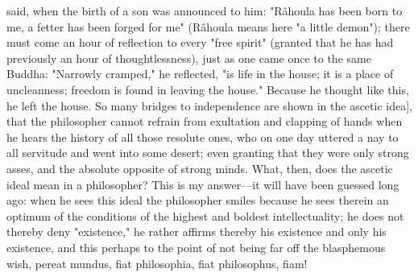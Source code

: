 \documentclass[12pt]{article}
\begin{document}
said, when the birth of a son was announced to him: "Râhoula has been born to me, a fetter has been forged for me" (Râhoula means here "a little demon"); there must come an hour of reflection to every "free spirit" (granted that he has had previously an hour of thoughtlessness), just as one came once to the same Buddha: "Narrowly cramped," he reflected, "is life in the house; it is a place of uncleanness; freedom is found in leaving the house." Because he thought like this, he left the house. So many bridges to independence are shown in the ascetic idea], that the philosopher cannot refrain from exultation and clapping of hands when he hears the history of all those resolute ones, who on one day uttered a nay to all servitude and went into some desert; even granting that they were only strong asses, and the absolute opposite of strong minds. What, then, does the ascetic ideal mean in a philosopher? This is my answer---it will have been guessed long ago: when he sees this ideal the philosopher smiles because he sees therein an optimum of the conditions of the highest and boldest intellectuality; he does not thereby deny "existence," he rather affirms thereby his existence and only his existence, and this perhaps to the point of not being far off the blasphemous wish, pereat mundus, fiat philosophia, fiat philosophus, fiam!
\end{document}
